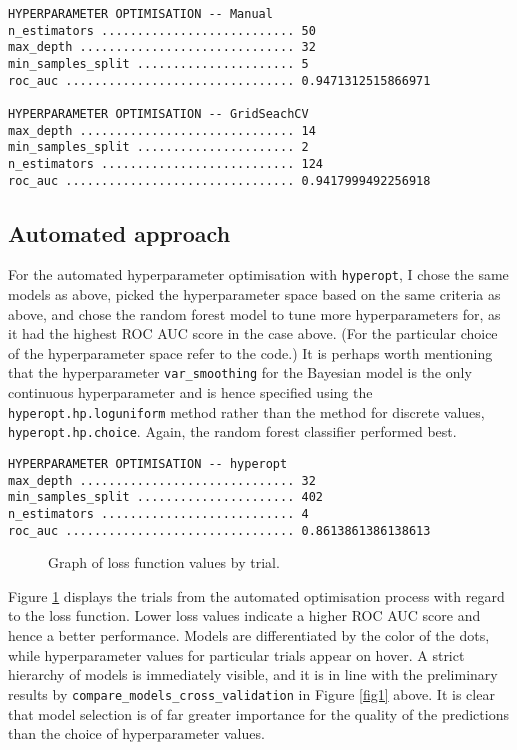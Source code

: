 \documentclass[10pt, a4paper]{article}
\begin{document}
\begin{verbatim}
HYPERPARAMETER OPTIMISATION -- Manual
n_estimators ........................... 50
max_depth .............................. 32
min_samples_split ...................... 5
roc_auc ................................ 0.9471312515866971

HYPERPARAMETER OPTIMISATION -- GridSeachCV
max_depth .............................. 14
min_samples_split ...................... 2
n_estimators ........................... 124
roc_auc ................................ 0.9417999492256918
\end{verbatim}

\subsection{Automated approach}
For the automated hyperparameter optimisation with \verb|hyperopt|, I chose the same models as above, picked the hyperparameter
space based on the same criteria as above, and chose the random forest model to tune more hyperparameters for, as it had the highest
ROC AUC score in the case above. (For the particular choice of the hyperparameter space refer to the code.) It is perhaps worth mentioning
that the hyperparameter \verb|var_smoothing| for the Bayesian model is the only continuous hyperparameter and is hence specified
using the \verb|hyperopt.hp.loguniform| method rather than the method for discrete values, \verb|hyperopt.hp.choice|. Again, the
random forest classifier performed best.

\begin{verbatim}
HYPERPARAMETER OPTIMISATION -- hyperopt
max_depth .............................. 32
min_samples_split ...................... 402
n_estimators ........................... 4
roc_auc ................................ 0.8613861386138613
\end{verbatim}

\begin{figure}[h]
\centering
{}
\caption{Graph of loss function values by trial.}
\label{fig2}
\end{figure}

Figure \ref{fig2} displays the trials from the automated optimisation process with regard to the loss function. Lower loss
values indicate a higher ROC AUC score and hence a better performance. Models are differentiated by the color of the dots, while
hyperparameter values for particular trials appear on hover. A strict hierarchy of models is immediately visible, and it is in line with
the preliminary results by \verb|compare_models_cross_validation| in Figure \ref{fig1} above. It is clear that model selection is of far greater importance
for the quality of the predictions than the choice of hyperparameter values.
\end{document}
